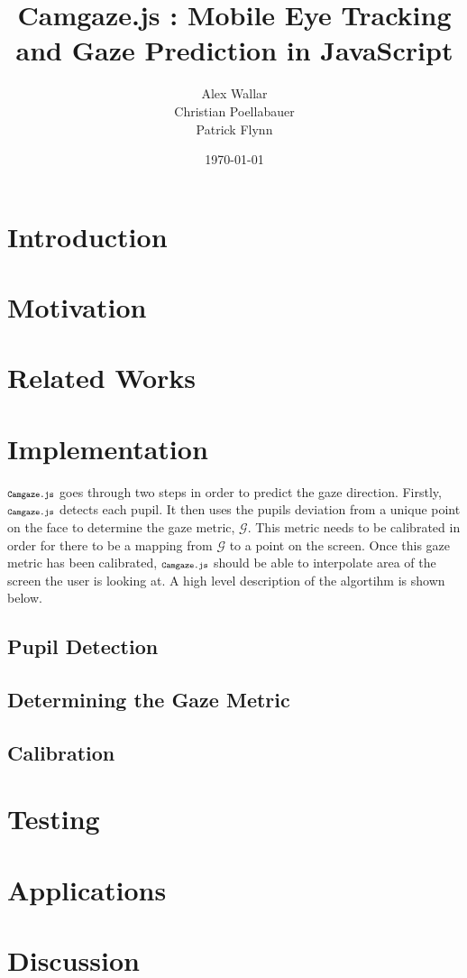 \documentclass[annual]{acmsiggraph}
\title{Camgaze.js : Mobile Eye Tracking and Gaze Prediction in JavaScript}
\author{Alex Wallar \\ Christian Poellabauer \\ Patrick Flynn}
\date{\today}
\newcommand{\Acronym}[1]{\ensuremath{{\small{\texttt{#1}}}}}
\newcommand{\Name}{\Acronym{Camgaze.js}}
\newcommand{\Symbol}[1]{\ensuremath{\mathcal{#1}}}
\begin{document}
\maketitle

\begin{abstract}
\end{abstract}

\section{Introduction}

\section{Motivation}

\section{Related Works}

\section{Implementation}

$\Name$ goes through two steps in order to predict the gaze direction. 
Firstly, $\Name$ detects each pupil. It then uses the pupils deviation 
from a unique point on the face to determine the gaze metric, \Symbol{G}. 
This metric needs to be calibrated in order for there to be a mapping 
from \Symbol{G} to a point on the screen. Once this gaze metric has been 
calibrated, $\Name$ should be able to interpolate area of the 
screen the user is looking at. A high level description of the 
algortihm is shown below.

\subsection{Pupil Detection}

\subsection{Determining the Gaze Metric}

\subsection{Calibration}

\section{Testing}

\section{Applications}

\section{Discussion}



\end{document}
